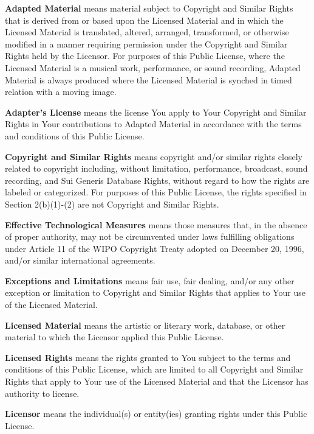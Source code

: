   \begin{myEnumerate}
    \item \textbf{Adapted Material} means material subject to Copyright and Similar Rights that is derived from or based upon
    the Licensed Material and in which the Licensed Material is translated, altered, arranged, transformed, or otherwise
    modified in a manner requiring permission under the Copyright and Similar Rights held by the Licensor. For purposes of
    this Public License, where the Licensed Material is a musical work, performance, or sound recording, Adapted Material is
    always produced where the Licensed Material is synched in timed relation with a moving image.
    \item \textbf{Adapter's License} means the license You apply to Your Copyright and Similar Rights in Your contributions
    to Adapted Material in accordance with the terms and conditions of this Public License.
    \item \textbf{Copyright and Similar Rights} means copyright and/or similar rights closely related to copyright including,
    without limitation, performance, broadcast, sound recording, and Sui Generis Database Rights, without regard to how the
    rights are labeled or categorized. For purposes of this Public License, the rights specified in Section 2(b)(1)-(2) are
    not Copyright and Similar Rights.
    \item \textbf{Effective Technological Measures} means those measures that, in the absence of proper authority, may not be
    circumvented under laws fulfilling obligations under Article 11 of the WIPO Copyright Treaty adopted on December 20,
    1996, and/or similar international agreements.
    \item \textbf{Exceptions and Limitations} means fair use, fair dealing, and/or any other exception or limitation to
    Copyright and Similar Rights that applies to Your use of the Licensed Material.
    \item \textbf{Licensed Material} means the artistic or literary work, database, or other material to which the Licensor
    applied this Public License.
    \item \textbf{Licensed Rights} means the rights granted to You subject to the terms and conditions of this Public
    License, which are limited to all Copyright and Similar Rights that apply to Your use of the Licensed Material and that
    the Licensor has authority to license.
    \item \textbf{Licensor} means the individual(s) or entity(ies) granting rights under this Public License.

\end{myEnumerate}
